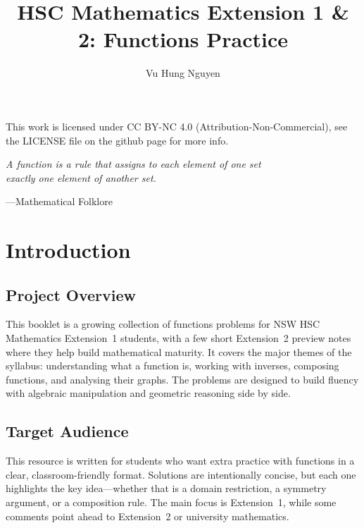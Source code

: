 \documentclass[12pt]{article}
\author{Vu Hung Nguyen}
\title{HSC Mathematics Extension 1 \& 2: Functions Practice}
\date{}
\theoremstyle{definition}
\begin{document}


\newpage



\begingroup\small\noindent This work is licensed under CC BY-NC 4.0 (Attribution-Non-Commercial), see the LICENSE file on the github page for more info.\par\endgroup

\newpage

\thispagestyle{empty}
\vspace*{\fill}
\begin{center}
\itshape
A function is a rule that assigns to each element of one set\\
exactly one element of another set.

\vspace{1em}
\normalfont ---Mathematical Folklore
\end{center}
\vspace*{\fill}

\newpage

\tableofcontents
\newpage

\section{Introduction}

\subsection{Project Overview}
This booklet is a growing collection of functions problems for NSW HSC Mathematics Extension~1 students, with a few short Extension~2 preview notes where they help build mathematical maturity. It covers the major themes of the syllabus: understanding what a function is, working with inverses, composing functions, and analysing their graphs. The problems are designed to build fluency with algebraic manipulation and geometric reasoning side by side.

\subsection{Target Audience}
This resource is written for students who want extra practice with functions in a clear, classroom-friendly format. Solutions are intentionally concise, but each one highlights the key idea---whether that is a domain restriction, a symmetry argument, or a composition rule. The main focus is Extension~1, while some comments point ahead to Extension~2 or university mathematics.
\end{document}
